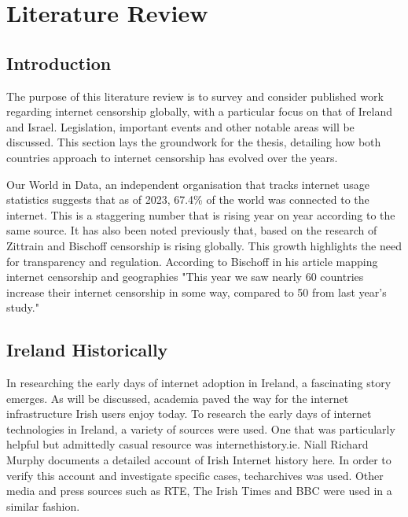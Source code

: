 \chapter{Literature Review}

\section{Introduction}
The purpose of this literature review is to survey and consider published work regarding internet censorship globally, with a particular focus on that of Ireland and Israel. Legislation, important events and other notable areas will be discussed. This section lays the groundwork for the thesis, detailing how both countries approach to internet censorship has evolved over the years. 

Our World in Data, an independent organisation that tracks internet usage statistics suggests that as of 2023, 67.4\% of the world was connected to the internet. \cite{owid-internet} This is a staggering number that is rising year on year according to the same source. It has also been noted previously that, based on the research of Zittrain \cite{zittrain2017shifting} and Bischoff \cite{bischoff2025internet} censorship is rising globally. This growth highlights the need for transparency and regulation. According to Bischoff in his article mapping internet censorship and geographies "This year we saw nearly 60 countries increase their internet censorship in some way, compared to 50 from last year’s study."\cite{bischoff2025internet} 

\section{Ireland Historically }
In researching the early days of internet adoption in Ireland, a fascinating story emerges. As will be discussed, academia paved the way for the internet infrastructure Irish users enjoy today. To research the early days of internet technologies in Ireland, a variety of sources were used. One that was particularly helpful but admittedly casual resource was internethistory.ie. \cite{InternetHistoryIE} Niall Richard Murphy documents a detailed account of Irish Internet history here. In order to verify this account and investigate specific cases, techarchives \cite{TechArchivesIE} was used. Other media and press sources such as RTE, The Irish Times and BBC were used in a similar fashion.

